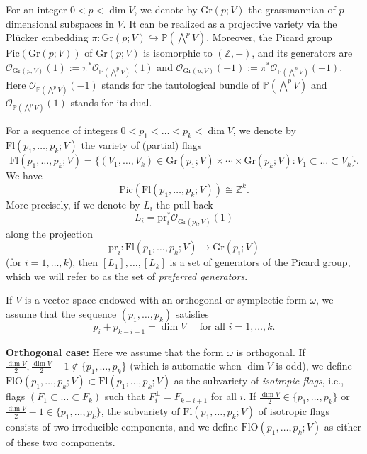 \documentclass[12pt]{amsart}
\newcommand{\Flags}{\mathrm{Fl}}
\newcommand{\Grass}{\mathrm{Gr}}
\newcommand{\OFlags}{\mathrm{FlO}}
\newcommand{\Pic}{\mathrm{Pic}}
\theoremstyle{definition}
\begin{document}
For an integer $0< p< \dim V$, we denote by $\Grass(p;V)$ the grassmannian of $p$-dimensional subspaces in $V$. 
It can be realized as a projective variety via the Pl\"ucker embedding $\pi:\Grass(p;V)\hookrightarrow \mathbb{P}(\bigwedge^p V)$. Moreover, the Picard group $\Pic(\Grass(p;V))$ of $\Grass(p;V)$ is isomorphic to $(\mathbb{Z},+)$, and its generators are $\mathcal{O}_{\Grass(p;V)}(1):=\pi^*\mathcal{O}_{\mathbb{P}(\bigwedge^pV)}(1)$ and $\mathcal{O}_{\Grass(p;V)}(-1):=\pi^*\mathcal{O}_{\mathbb{P}(\bigwedge^pV)}(-1)$. %
Here $\mathcal{O}_{\mathbb{P}(\bigwedge^pV)}(-1)$ stands for the tautological bundle of $\mathbb{P}(\bigwedge^pV)$ and $\mathcal{O}_{\mathbb{P}(\bigwedge^pV)}(1)$ stands for its dual.

For a sequence of integers $0<p_1<\ldots<p_k<\dim V$, we denote by $\Flags(p_1,\ldots,p_k;V)$ the variety of (partial) flags
\[
\Flags(p_1,\ldots,p_k;V)=\{(V_1,\ldots,V_k)\in\Grass(p_1;V)\times\cdots\times\Grass(p_k;V):V_1\subset\ldots\subset V_k\}.
\]
We have 
\[\Pic(\Flags(p_1,\ldots,p_k;V))\cong \mathbb{Z}^{k}.\]
More precisely, if we denote by $L_i$ the pull-back 
\[L_i=\mathrm{pr}_i^*\mathcal{O}_{\Grass(p_i;V)}(1)\]
along the projection 
\[\mathrm{pr}_i:\Flags(p_1,\ldots,p_k;V)\to \Grass(p_i;V)\]
(for $i=1,\ldots,k$),
then $[L_1],\ldots,[L_{k}]$ is a set of generators of the Picard group, which we will refer to as the set of {\em preferred generators}.

If $V$ is a vector space endowed with an orthogonal or symplectic form $\omega$, we assume that the sequence $(p_1,\ldots,p_k)$ satisfies 
$$p_i+p_{k-i+1}=\dim V\quad\mbox{ for all $i=1,\ldots,k$}.$$ 

\bigskip

{\bf Orthogonal case:} Here we assume that the form $\omega$ is orthogonal.
If $\frac{\dim V}{2},\frac{\dim V}{2}-1\notin\{p_1,\ldots,p_k\}$ (which is automatic when $\dim V$ is odd), we define $\OFlags(p_1,\ldots,p_k;V)\subset\Flags(p_1,\ldots,p_k;V)$ as the subvariety of {\it isotropic flags}, i.e., flags $(F_1\subset\ldots\subset F_k)$ such that $F_i^\perp= F_{k-i+1}$ for all $i$. If $\frac{\dim V}{2}\in\{p_1,\ldots,p_k\}$ or $\frac{\dim V}{2}-1\in\{p_1,\ldots,p_k\}$, the subvariety of $\Flags(p_1,\ldots,p_k;V)$ of isotropic flags consists of two irreducible components, and we define $\OFlags(p_1,\ldots,p_k;V)$ as either of these two components.
\end{document}
